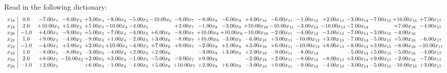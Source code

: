 \documentclass[9pt]{article}
\begin{document}
Read in the following dictionary:
\[\begin{array}{c| c c@{\hskip 2pt} c@{\hskip 2pt} c@{\hskip 2pt} c@{\hskip 2pt} c@{\hskip 2pt} c@{\hskip 2pt} c@{\hskip 2pt} c@{\hskip 2pt} c@{\hskip 2pt} c@{\hskip 2pt} c@{\hskip 2pt} c@{\hskip 2pt} c@{\hskip 2pt} c@{\hskip 2pt} c@{\hskip 2pt} c@{\hskip 2pt} c@{\hskip 2pt} }
 x_{18}   &  0.0 & -7.00 x_{1} & -8.00 x_{2} & +  3.00 x_{3} & -8.00 x_{4} & -5.00 x_{5} & -10.00 x_{6} & -8.00 x_{7} & -8.00 x_{8} & -6.00 x_{9} & +  4.00 x_{10} & -6.00 x_{11} & -1.00 x_{12} & +  2.00 x_{13} & -3.00 x_{14} & -7.00 x_{15} & + 10.00 x_{16} & +  7.00 x_{17}\\
 x_{19}   &  2.0 & + 10.00 x_{1} & +  5.00 x_{2} & +  1.00 x_{3} & -10.00 x_{4} & -4.00 x_{5} &   & +  2.00 x_{7} & -1.00 x_{8} & -3.00 x_{9} & + 10.00 x_{10} & -10.00 x_{11} & -3.00 x_{12} & -10.00 x_{13} & -7.00 x_{14} &   & +  7.00 x_{16} & -4.00 x_{17}\\
 x_{20}   &  -1.0 & +  4.00 x_{1} & -9.00 x_{2} & +  5.00 x_{3} & -7.00 x_{4} & -4.00 x_{5} & +  6.00 x_{6} & -8.00 x_{7} & + 10.00 x_{8} & + 10.00 x_{9} & -10.00 x_{10} & -2.00 x_{11} & -4.00 x_{12} & -3.00 x_{13} & -7.00 x_{14} & -3.00 x_{15} & -4.00 x_{16} &   \\
 x_{21}   &  1.0 & +  9.00 x_{1} & -4.00 x_{2} & -9.00 x_{3} & +  1.00 x_{4} & -2.00 x_{5} & +  3.00 x_{6} & -8.00 x_{7} & + 10.00 x_{8} & -3.00 x_{9} & -6.00 x_{10} & +  3.00 x_{11} & -10.00 x_{12} & +  3.00 x_{13} & -7.00 x_{14} & -5.00 x_{15} & +  5.00 x_{16} & -6.00 x_{17}\\
 x_{22}   &  -1.0 & -4.00 x_{1} & +  3.00 x_{2} & +  2.00 x_{3} & + 10.00 x_{4} & -4.00 x_{5} & +  7.00 x_{6} & +  9.00 x_{7} & -2.00 x_{8} & +  1.00 x_{9} & +  3.00 x_{10} & +  6.00 x_{11} & -10.00 x_{12} & +  8.00 x_{13} & -8.00 x_{14} & +  3.00 x_{15} & -8.00 x_{16} & -10.00 x_{17}\\
 x_{23}   &  1.0 & -8.00 x_{1} & -8.00 x_{2} & -3.00 x_{3} & -4.00 x_{4} & +  2.00 x_{5} & +  2.00 x_{6} &   & -3.00 x_{8} & +  3.00 x_{9} & +  2.00 x_{10} & -9.00 x_{11} & -8.00 x_{12} &   & -5.00 x_{14} & +  5.00 x_{15} & -5.00 x_{16} & -4.00 x_{17}\\
 x_{24}   &  2.0 & +  8.00 x_{1} & -10.00 x_{2} & +  2.00 x_{3} & +  3.00 x_{4} & -1.00 x_{5} & -5.00 x_{6} & -9.00 x_{7} & +  9.00 x_{8} &   & -2.00 x_{10} & -2.00 x_{11} & -8.00 x_{12} & -8.00 x_{13} & +  3.00 x_{14} & +  9.00 x_{15} & -2.00 x_{16} & -7.00 x_{17}\\
 x_{25}   &  -1.0 & +  2.00 x_{1} &   & +  6.00 x_{3} & -1.00 x_{4} & -4.00 x_{5} & +  5.00 x_{6} & + 10.00 x_{7} & +  2.00 x_{8} & +  6.00 x_{9} & -3.00 x_{10} & +  9.00 x_{11} & -9.00 x_{12} & -4.00 x_{13} & -3.00 x_{14} & -5.00 x_{15} & -10.00 x_{16} & +  3.00 x_{17}\\

\end{array}\]
\end{document}
